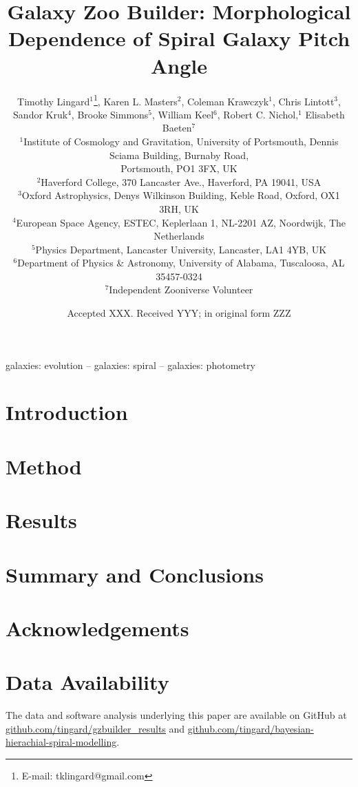\documentclass[fleqn,usenatbib]{mnras}
\title[Galaxy Zoo Builder: Morphological Dependence of Spiral galaxy Pitch Angle]{Galaxy Zoo Builder: Morphological Dependence of Spiral Galaxy Pitch Angle}
\author[T. Lingard et al.]{
  Timothy Lingard$^{1}$\thanks{E-mail: tklingard@gmail.com}, %
  Karen L. Masters$^{2}$, %
  Coleman Krawczyk$^{1}$, %
  Chris Lintott$^{3}$, %
  \newauthor
  Sandor Kruk$^{4}$, %
  Brooke Simmons$^{5}$, %
  William Keel$^{6}$, %
  Robert C. Nichol,$^{1}$ %
  \newauthor
  Elisabeth Baeten$^{7}$
  \\
  $^{1}$Institute of Cosmology and Gravitation, University of Portsmouth, Dennis Sciama Building, Burnaby Road,\\
  Portsmouth, PO1 3FX, UK\\
  $^{2}$Haverford College, 370 Lancaster Ave., Haverford, PA 19041, USA\\
  $^{3}$Oxford Astrophysics, Denys Wilkinson Building, Keble Road, Oxford, OX1 3RH, UK\\
  $^{4}$European Space Agency, ESTEC, Keplerlaan 1, NL-2201 AZ, Noordwijk, The Netherlands\\
  $^{5}$Physics Department, Lancaster University, Lancaster, LA1 4YB, UK\\
  $^{6}$Department of Physics \& Astronomy, University of Alabama, Tuscaloosa, AL 35457-0324\\
  $^{7}$Independent Zooniverse Volunteer\\
}
\date{Accepted XXX. Received YYY; in original form ZZZ}
\begin{document}
\label{firstpage}
\pagerange{\pageref{firstpage}--\pageref{lastpage}}
\maketitle

\begin{abstract}

\end{abstract}

\begin{keywords}
galaxies: evolution -- galaxies: spiral -- galaxies: photometry
\end{keywords}



% 

\section{Introduction}


\section{Method}


\section{Results}


\section{Summary and Conclusions}


\section{Acknowledgements}


\section{Data Availability}
The data and software analysis underlying this paper are available on GitHub at \url{github.com/tingard/gzbuilder_results} and \url{github.com/tingard/bayesian-hierachial-spiral-modelling}.
\end{document}
